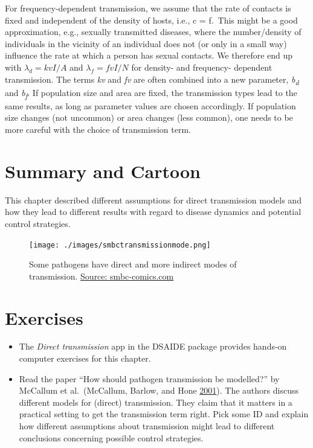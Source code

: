 \documentclass[
]{book}
\providecommand{\tightlist}{%
  \setlength{\itemsep}{0pt}\setlength{\parskip}{0pt}}
\begin{document}
For frequency-dependent transmission, we assume that the rate of contacts is fixed and independent of the density of hosts, i.e., c = f.~This might be a good approximation, e.g., sexually transmitted diseases, where the number/density of individuals in the vicinity of an individual does not (or only in a small way) influence the rate at which a person has sexual contacts. We therefore end up with \(\lambda_d= kv I/A\) and \(\lambda_f= fv I/N\) for density- and frequency- dependent transmission. The terms \emph{kv} and \emph{fv} are often combined into a new parameter, \emph{b\textsubscript{d}} and \emph{b\textsubscript{f}}. If population size and area are fixed, the transmission types lead to the same results, as long as parameter values are chosen accordingly. If population size changes (not uncommon) or area changes (less common), one needs to be more careful with the choice of transmission term.

\hypertarget{summary-and-cartoon-5}{%
\section{Summary and Cartoon}\label{summary-and-cartoon-5}}

This chapter described different assumptions for direct transmission models and how they lead to different results with regard to disease dynamics and potential control strategies.

\begin{figure}
\centering
\texttt{[image: ./images/smbctransmissionmode.png]}
\caption{Some pathogens have direct and more indirect modes of transmission. \href{http://www.smbc-comics.com/}{Source: smbc-comics.com}}
\end{figure}

\hypertarget{exercises-5}{%
\section{Exercises}\label{exercises-5}}

\begin{itemize}
\tightlist
\item
  The \emph{Direct transmission} app in the DSAIDE package provides hands-on computer exercises for this chapter.
\item
  Read the paper ``How should pathogen transmission be modelled?'' by McCallum et al.~(McCallum, Barlow, and Hone \protect\hyperlink{ref-mccallum01}{2001}). The authors discuss different models for (direct) transmission. They claim that it matters in a practical setting to get the transmission term right. Pick some ID and explain how different assumptions about transmission might lead to different conclusions concerning possible control strategies.
\end{itemize}
\end{document}
